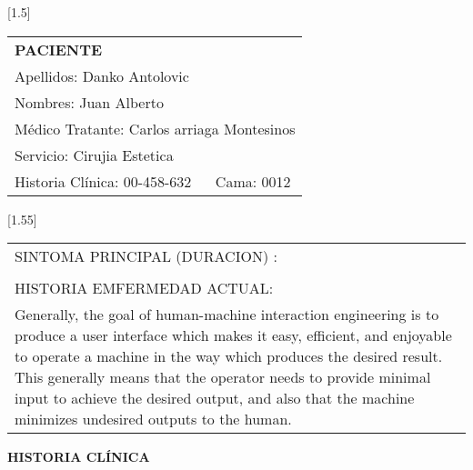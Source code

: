 \documentclass[10pt,a4paper]{article}
\begin{document}
 
\hfill
\begin{minipage}{10cm}
\begin{flushleft}
\scalebox{1.4}[1.5]{
\begin{tabular}{|p{3cm}p{2.3cm}|}
\hline 
\multicolumn{2}{|l|}{\scriptsize{\textbf{PACIENTE}}}\\
\multicolumn{2}{|p{5.3cm}|}{\scriptsize{Apellidos: Danko Antolovic}}\\ 
\multicolumn{2}{|p{5.3cm}|}{\scriptsize{Nombres: Juan Alberto}}\\ 
\multicolumn{2}{|p{5.3cm}|}{\scriptsize{M\'edico Tratante: Carlos arriaga Montesinos}}\\ 
\hline 
\multicolumn{2}{|p{5.3cm}|}{\scriptsize{Servicio: Cirujia Estetica}}\\
\hline 
\scriptsize{Historia Cl\'inica: 00-458-632}&\scriptsize{Cama: 0012} \\ 
\hline 
\end{tabular}}
\end{flushleft}
\end{minipage}

\vspace{0.5cm}
\scalebox{1.4}[1.55]{
\begin{tabular}{|p{12.5cm}|}
\hline 
\scriptsize{SINTOMA PRINCIPAL (DURACION) :}\\
\multicolumn{1}{|p{12.5cm}|}{\scriptsize{}}\\ 
\scriptsize{HISTORIA EMFERMEDAD ACTUAL:}\\
\multicolumn{1}{|p{12.5cm}|}{\scriptsize{Generally, the goal of human-machine interaction engineering is to produce a user interface which makes it easy, efficient, and enjoyable to operate a machine in the way which produces the desired result. This generally means that the operator needs to provide minimal input to achieve the desired output, and also that the machine minimizes undesired outputs to the human.}}\\
\hline 
\end{tabular}}
\vspace{0.6cm}
\begin{flushleft}
\begin{LARGE}
\textbf{HISTORIA CL\'INICA}
\end{LARGE}
\end{flushleft}
\end{document}

